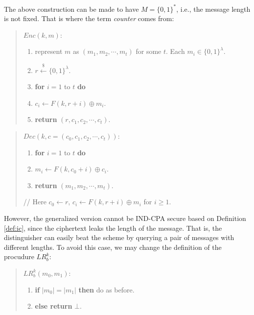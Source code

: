 \documentclass[12pt]{article}
\newcommand{\bits}{\{0,1\}}
\newcommand{\getsr}{\stackrel{\$}{\gets}}
\newcommand{\tab}{\hspace{0.3in}}
\theoremstyle{definition}
\begin{document}
The above construction can be made to have $M = \bits^*$, i.e., the message length is not fixed. That is where the term \emph{counter} comes from:
\begin{quote}
$Enc(k, m)$:
\begin{enumerate}
\item represent $m$ as $(m_1, m_2, \cdots, m_t)$ for some $t$. Each $m_i \in \bits^\lambda$.
\item $r \getsr \bits^\lambda$.
\item {\bf for} $i=1$ to $t$ {\bf do}
\item \tab $c_i \gets F(k,r+i) \oplus m_i$.
\item {\bf return} $(r, c_1, c_2, \cdots, c_t)$.
\end{enumerate}
\end{quote}

\begin{quote}
$Dec(k, c=(c_0, c_1, c_2, \cdots, c_t))$:
\begin{enumerate}
\item {\bf for} $i=1$ to $t$ {\bf do}
\item \tab $m_i \gets F(k, c_0+i) \oplus c_i$.
\item {\bf return} $(m_1, m_2, \cdots, m_t)$.
\end{enumerate}
// Here $c_0 \gets r$, $c_i \gets F(k,r+i) \oplus m_i$ for $i\geq 1$.
\end{quote}

However, the generalized version cannot be IND-CPA secure based on Definition \ref{def:ic}, since the ciphertext leaks the length of the message. 
That is, the distinguisher can easily beat the scheme by querying a pair of messages with different lengths.
To avoid this case, we may change the definition of the procudure $LR_b^k$:
\begin{quote}
$LR_b^k(m_0, m_1)$:
\begin{enumerate}
\item {\bf if} $|m_0| = |m_1|$ {\bf then} do as before.
\item {\bf else return} $\bot$.
\end{enumerate}
\end{quote}
\end{document}
